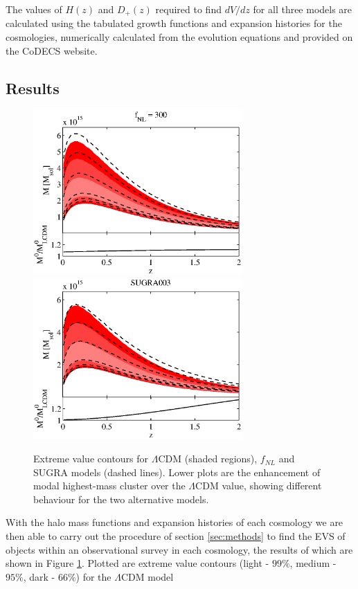 \documentclass[twocolumn,useAMS,usenatbib,usegraphicx]{mn2e}
\newcommand{\lcdm}{$\Lambda$CDM }
\begin{document}
The values of $H(z)$ and $D_{+}(z)$ required to find $dV/dz$ for all
three models are calculated using the tabulated growth functions and
expansion histories for the cosmologies, numerically calculated from
the evolution equations and provided on the CoDECS website.
\subsection{Results}
\begin{figure}
 \begin{centering}
  \includegraphics[width=80mm]{models_fnl_fin.eps}
  \includegraphics[width=80mm]{models_sugra_fin.eps}
 \caption{Extreme value contours for \lcdm (shaded regions), $f_{NL}$ and SUGRA models (dashed lines). Lower plots are the enhancement of modal highest-mass cluster over the \lcdm value, showing different behaviour for the two alternative models.}
    \label{fig:models}
 \end{centering}
\end{figure}
With the halo mass functions and expansion histories of each
cosmology we are then able to carry out the procedure of section
\ref{sec:methods} to find the EVS of objects within an
observational survey in each cosmology, the results of which are
shown in Figure \ref{fig:models}. Plotted are extreme value contours
(light - $99\%$, medium - $95\%$, dark - $66\%$) for the \lcdm model
\end{document}
